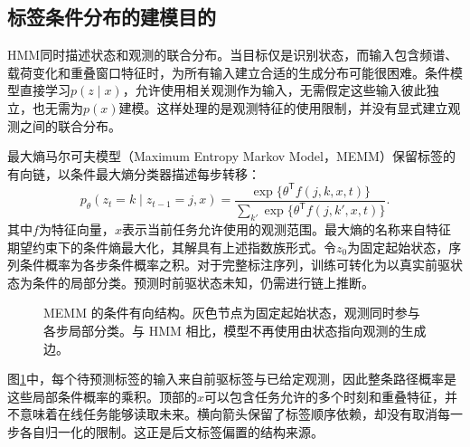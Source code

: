 \subsection{标签条件分布的建模目的}
HMM同时描述状态和观测的联合分布。当目标仅是识别状态，而输入包含频谱、载荷变化和重叠窗口特征时，为所有输入建立合适的生成分布可能很困难。条件模型直接学习$p(z\mid x)$，允许使用相关观测作为输入，无需假定这些输入彼此独立，也无需为$p(x)$建模。这样处理的是观测特征的使用限制，并没有显式建立观测之间的联合分布。

最大熵马尔可夫模型（Maximum Entropy Markov Model，MEMM）保留标签的有向链，以条件最大熵分类器描述每步转移\cite{mccallum2000memm}：
\begin{equation}
 p_\theta(z_t=k\mid z_{t-1}=j,x)=
 \frac{\exp\{\theta^{\mathsf T}f(j,k,x,t)\}}
 {\sum_{k'}\exp\{\theta^{\mathsf T}f(j,k',x,t)\}}.
\end{equation}
其中$f$为特征向量，$x$表示当前任务允许使用的观测范围。最大熵的名称来自特征期望约束下的条件熵最大化，其解具有上述指数族形式。令$z_0$为固定起始状态，序列条件概率为各步条件概率之积。对于完整标注序列，训练可转化为以真实前驱状态为条件的局部分类。预测时前驱状态未知，仍需进行链上推断。

\begin{figure}[htbp]
\centering
{}
\caption{MEMM 的条件有向结构。灰色节点为固定起始状态，观测同时参与各步局部分类。与 HMM 相比，模型不再使用由状态指向观测的生成边。}
\label{fig:bayes-memm-structure}
\end{figure}
图\ref{fig:bayes-memm-structure}中，每个待预测标签的输入来自前驱标签与已给定观测，因此整条路径概率是这些局部条件概率的乘积。顶部的$x$可以包含任务允许的多个时刻和重叠特征，并不意味着在线任务能够读取未来。横向箭头保留了标签顺序依赖，却没有取消每一步各自归一化的限制。这正是后文标签偏置的结构来源。

